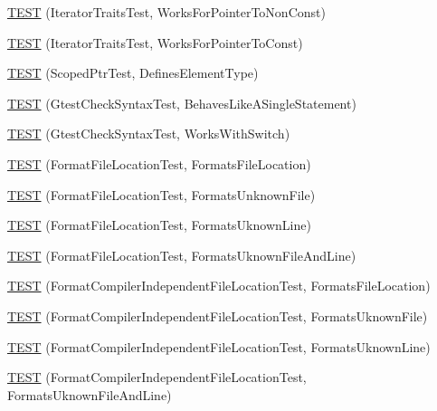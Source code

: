 \begin{DoxyCompactItemize}
\item 
\hyperlink{namespacetesting_1_1internal_a642234d85836450bb8795cf0a8a9f908}{\-T\-E\-S\-T} (\-Iterator\-Traits\-Test, \-Works\-For\-Pointer\-To\-Non\-Const)
\item 
\hyperlink{namespacetesting_1_1internal_afc0e95a0472d243967fd4720c681c478}{\-T\-E\-S\-T} (\-Iterator\-Traits\-Test, \-Works\-For\-Pointer\-To\-Const)
\item 
\hyperlink{namespacetesting_1_1internal_a99f56e2e9d5b30a879f877cc72bb0c0c}{\-T\-E\-S\-T} (\-Scoped\-Ptr\-Test, \-Defines\-Element\-Type)
\item 
\hyperlink{namespacetesting_1_1internal_a26d00130a017a66d0d60dc5a02a13d25}{\-T\-E\-S\-T} (\-Gtest\-Check\-Syntax\-Test, \-Behaves\-Like\-A\-Single\-Statement)
\item 
\hyperlink{namespacetesting_1_1internal_a4dfd147ff396984fca799878cb53dcea}{\-T\-E\-S\-T} (\-Gtest\-Check\-Syntax\-Test, \-Works\-With\-Switch)
\item 
\hyperlink{namespacetesting_1_1internal_a1a1c20d78e9e75b9c7f2b767eb62611b}{\-T\-E\-S\-T} (\-Format\-File\-Location\-Test, \-Formats\-File\-Location)
\item 
\hyperlink{namespacetesting_1_1internal_ace2f5407afdfb0767035d44b6758e4a0}{\-T\-E\-S\-T} (\-Format\-File\-Location\-Test, \-Formats\-Unknown\-File)
\item 
\hyperlink{namespacetesting_1_1internal_a17d1f472b6c1154de7b5b008b964ee32}{\-T\-E\-S\-T} (\-Format\-File\-Location\-Test, \-Formats\-Uknown\-Line)
\item 
\hyperlink{namespacetesting_1_1internal_a1195aaf7258c5442de7aebd95acefb9f}{\-T\-E\-S\-T} (\-Format\-File\-Location\-Test, \-Formats\-Uknown\-File\-And\-Line)
\item 
\hyperlink{namespacetesting_1_1internal_a9c12f8c1ebb19906e8fa0c430d139076}{\-T\-E\-S\-T} (\-Format\-Compiler\-Independent\-File\-Location\-Test, \-Formats\-File\-Location)
\item 
\hyperlink{namespacetesting_1_1internal_a65ad1cad17717c1b8ac4c2d4bef5e079}{\-T\-E\-S\-T} (\-Format\-Compiler\-Independent\-File\-Location\-Test, \-Formats\-Uknown\-File)
\item 
\hyperlink{namespacetesting_1_1internal_a0315a64a661f249628f2884080e0614f}{\-T\-E\-S\-T} (\-Format\-Compiler\-Independent\-File\-Location\-Test, \-Formats\-Uknown\-Line)
\item 
\hyperlink{namespacetesting_1_1internal_a8b9aee556f3dec6e67c35830ba55e0bd}{\-T\-E\-S\-T} (\-Format\-Compiler\-Independent\-File\-Location\-Test, \-Formats\-Uknown\-File\-And\-Line)

\end{DoxyCompactItemize}
